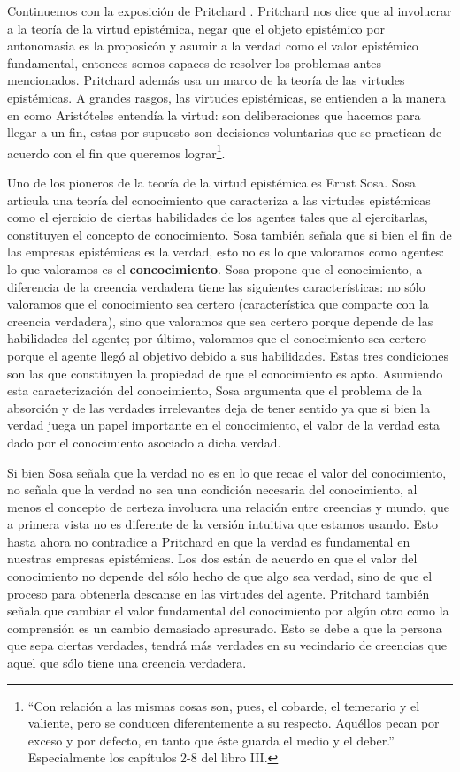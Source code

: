 \documentclass[12pt]{article}
\begin{document}
Continuemos con la exposición de Pritchard \cite{Pritchard2021}. Pritchard nos dice que al involucrar a la teoría de la virtud epistémica, negar que el objeto epistémico por antonomasia es la proposicón y asumir a la verdad como el valor epistémico fundamental, entonces somos capaces de resolver los problemas antes mencionados. Pritchard además usa un marco de la teoría de las virtudes epistémicas. A grandes rasgos, las virtudes epistémicas, se entienden a la manera en como Aristóteles entendía la virtud: son deliberaciones que hacemos para llegar a un fin, estas por supuesto son decisiones voluntarias que se practican de acuerdo con el fin que queremos lograr\footnote{``Con relación a las mismas cosas son, pues, el cobarde, el temerario y el valiente, pero se conducen diferentemente a su respecto. Aquéllos pecan por exceso y por defecto, en tanto que éste guarda el medio y el deber.'' \cite{aristotelesnico} Especialmente los capítulos 2-8 del libro III.}. 

Uno de los pioneros de la teoría de la virtud epistémica es Ernst Sosa. Sosa \citeyear{Sosa2017-SOSE} articula una teoría del conocimiento que caracteriza a las virtudes epistémicas como el ejercicio de ciertas habilidades de los agentes tales que al ejercitarlas, constituyen el concepto de conocimiento. Sosa también señala que si bien el fin de las empresas epistémicas es la verdad, esto no es lo que valoramos como agentes: lo que valoramos es el \textbf{concocimiento}. Sosa \citeyear[pp. 11-113]{Sosa2017-SOSE} propone que el conocimiento, a diferencia de la creencia verdadera tiene las siguientes características: no sólo valoramos que el conocimiento sea certero (característica que comparte con la creencia verdadera), sino que valoramos que sea certero porque depende de las habilidades del agente; por último, valoramos que el conocimiento sea certero porque el agente llegó al objetivo debido a sus habilidades. Estas tres condiciones son las que constituyen la propiedad de que el conocimiento es apto. Asumiendo esta caracterización del conocimiento, Sosa argumenta que el problema de la absorción y de las verdades irrelevantes deja de tener sentido ya que si bien la verdad juega un papel importante en el conocimiento, el valor de la verdad esta dado por el conocimiento asociado a dicha verdad.

Si bien Sosa señala que la verdad no es en lo que recae el valor del conocimiento, no señala que la verdad no sea una condición necesaria del conocimiento, al menos el concepto de certeza involucra una relación entre creencias y mundo, que a primera vista no es diferente de la versión intuitiva que estamos usando. Esto hasta ahora no contradice a Pritchard en que la verdad es fundamental en nuestras empresas epistémicas. Los dos están de acuerdo en que el valor del conocimiento no depende del sólo hecho de que algo sea verdad, sino de que el proceso para obtenerla descanse en las virtudes del agente. Pritchard también señala que cambiar el valor fundamental del conocimiento por algún otro como la comprensión es un cambio demasiado apresurado. Esto se debe a que la persona que sepa ciertas verdades, tendrá más verdades en su vecindario de creencias que aquel que sólo tiene una creencia verdadera.
\end{document}
